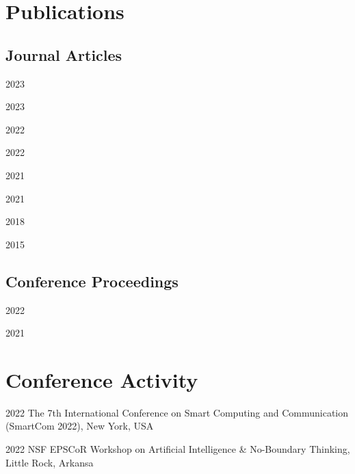 \documentclass[12pt,letterpaper]{report}
\begin{document}
    \section*{Publications}
    \subsection*{Journal Articles}
    \begin{tablist}
        \item[2023] \tab{}
        \item[2023] \tab{}
        \item[2022] \tab{}
        \item[2022] \tab{} 
        \item[2021] \tab{}
        \item[2021] \tab{}
        \item[2018] \tab{}
        \item[2015] \tab{}
    \end{tablist}

    \subsection*{Conference Proceedings}
    \begin{tablist}
        \item[2022] \tab{}
        \item[2021] \tab{}
    \end{tablist}


    \section*{Conference Activity}
    \begin{tablist}
        \item[2022] \tab{}The 7th International Conference on Smart Computing and Communication (SmartCom 2022), New York, USA
        \item[2022] \tab{}NSF EPSCoR Workshop on Artificial Intelligence \& No-Boundary Thinking, Little Rock, Arkansa
    \end{tablist}
\end{document}
